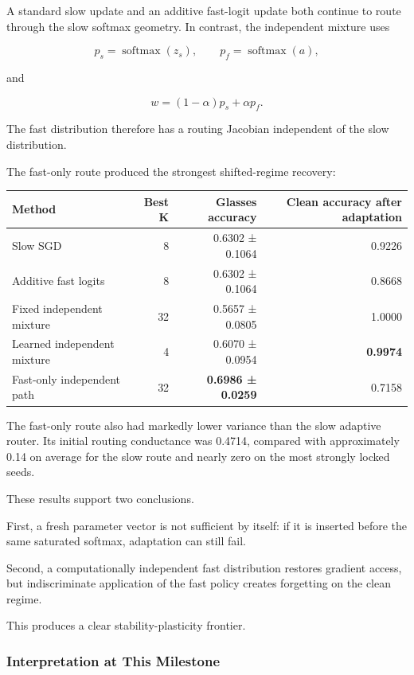 \documentclass[
  10pt,
]{article}
\begin{document}
A standard slow update and an additive fast-logit update both continue
to route through the slow softmax geometry. In contrast, the independent
mixture uses

\[
p_s=\operatorname{softmax}(z_s), \qquad
p_f=\operatorname{softmax}(a),
\]

and

\[
w=(1-\alpha)p_s+\alpha p_f.
\]

The fast distribution therefore has a routing Jacobian independent of
the slow distribution.

The fast-only route produced the strongest shifted-regime recovery:

\begin{longtable}[]{@{}lrrr@{}}
\toprule\noalign{}
Method & Best K & Glasses accuracy & Clean accuracy after adaptation \\
\midrule\noalign{}
\endhead
\bottomrule\noalign{}
\endlastfoot
Slow SGD & 8 & 0.6302 ± 0.1064 & 0.9226 \\
Additive fast logits & 8 & 0.6302 ± 0.1064 & 0.8668 \\
Fixed independent mixture & 32 & 0.5657 ± 0.0805 & 1.0000 \\
Learned independent mixture & 4 & 0.6070 ± 0.0954 & \textbf{0.9974} \\
Fast-only independent path & 32 & \textbf{0.6986 ± 0.0259} & 0.7158 \\
\end{longtable}

The fast-only route also had markedly lower variance than the slow
adaptive router. Its initial routing conductance was 0.4714, compared
with approximately 0.14 on average for the slow route and nearly zero on
the most strongly locked seeds.

These results support two conclusions.

First, a fresh parameter vector is not sufficient by itself: if it is
inserted before the same saturated softmax, adaptation can still fail.

Second, a computationally independent fast distribution restores
gradient access, but indiscriminate application of the fast policy
creates forgetting on the clean regime.

This produces a clear stability-plasticity frontier.

\hypertarget{interpretation-at-this-milestone}{%
\subsubsection{Interpretation at This
Milestone}\label{interpretation-at-this-milestone}}
\end{document}
